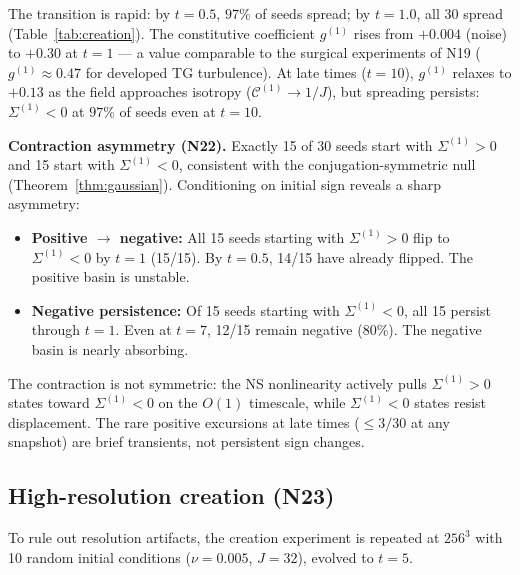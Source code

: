 \documentclass[11pt]{article}
\theoremstyle{definition}
\newcommand{\cC}{\mathcal{C}}
\begin{document}
The transition is rapid: by $t=0.5$, $97\%$ of
seeds spread; by $t=1.0$, all 30 spread
(Table~\ref{tab:creation}).  The constitutive
coefficient $g^{(1)}$ rises from $+0.004$ (noise)
to $+0.30$ at $t=1$ --- a value comparable to the
surgical experiments of N19 ($g^{(1)}\approx 0.47$
for developed TG turbulence).  At late times
($t=10$), $g^{(1)}$ relaxes to $+0.13$ as the
field approaches isotropy
($\cC^{(1)}\to 1/J$), but spreading
persists: $\Sigma^{(1)}<0$ at $97\%$ of seeds
even at $t=10$.

\medskip\noindent\textbf{Contraction asymmetry (N22).}
Exactly 15 of 30 seeds start with $\Sigma^{(1)}>0$
and 15 start with $\Sigma^{(1)}<0$, consistent with
the conjugation-symmetric null (Theorem~\ref{thm:gaussian}).
Conditioning on initial sign reveals a sharp asymmetry:
\begin{itemize}[leftmargin=2em]
\item \textbf{Positive $\to$ negative:}
  All 15 seeds starting with $\Sigma^{(1)}>0$
  flip to $\Sigma^{(1)}<0$ by $t=1$ (15/15).
  By $t=0.5$, 14/15 have already flipped.  The
  positive basin is unstable.
\item \textbf{Negative persistence:}
  Of 15 seeds starting with $\Sigma^{(1)}<0$,
  all 15 persist through $t=1$.  Even at $t=7$,
  12/15 remain negative (80\%).  The negative
  basin is nearly absorbing.
\end{itemize}
The contraction is not symmetric: the NS
nonlinearity actively pulls $\Sigma^{(1)}>0$
states toward $\Sigma^{(1)}<0$ on the $O(1)$
timescale, while $\Sigma^{(1)}<0$ states resist
displacement.  The rare positive excursions
at late times ($\leq 3/30$ at any snapshot) are
brief transients, not persistent sign changes.

\subsection{High-resolution creation (N23)}
\label{sec:creation-highres}

To rule out resolution artifacts, the creation
experiment is repeated at $256^3$ with 10 random
initial conditions ($\nu=0.005$, $J=32$),
evolved to $t=5$.
\end{document}
